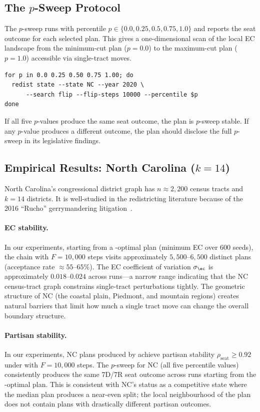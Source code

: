 \subsection{The $p$-Sweep Protocol}

The $p$-sweep runs \flip{} with percentile $p \in \{0.0, 0.25, 0.5, 0.75, 1.0\}$
and reports the seat outcome for each selected plan.
This gives a one-dimensional scan of the local EC landscape from the
minimum-cut plan ($p = 0.0$) to the maximum-cut plan ($p = 1.0$) accessible
via single-tract moves.

\begin{verbatim}
for p in 0.0 0.25 0.50 0.75 1.00; do
  redist state --state NC --year 2020 \
      --search flip --flip-steps 10000 --percentile $p
done
\end{verbatim}

If all five $p$-values produce the same seat outcome, the plan is
$p$-sweep stable.
If any $p$-value produces a different outcome, the plan should disclose the
full $p$-sweep in its legislative findings.

\subsection{Empirical Results: North Carolina ($k = 14$)}

North Carolina's congressional district graph has $n \approx 2{,}200$ census
tracts and $k = 14$ districts.
It is well-studied in the redistricting literature because of the 2016
``Rucho'' gerrymandering litigation~\citep{rucho2019}.

\paragraph{EC stability.}
In our experiments, starting from a \cs{}-optimal plan (minimum EC over
600 seeds), the \flip{} chain with $F = 10{,}000$ steps visits approximately
$5{,}500$--$6{,}500$ distinct plans (acceptance rate $\approx 55$--$65\%$).
The EC coefficient of variation $\sigma_{\ec}$ is approximately $0.018$--$0.024$
across runs---a narrow range indicating that the NC census-tract graph
constrains single-tract perturbations tightly.
The geometric structure of NC (the coastal plain, Piedmont, and mountain
regions) creates natural barriers that limit how much a single tract move
can change the overall boundary structure.

\paragraph{Partisan stability.}
In our experiments, NC plans produced by \cs{} achieve partisan stability
$\rho_{\mathrm{seat}} \geq 0.92$ under \flip{} with $F = 10{,}000$ steps.
The $p$-sweep for NC (all five percentile values) consistently produces the
same 7D/7R seat outcome across runs starting from the \cs{}-optimal plan.
This is consistent with NC's status as a competitive state where the median
plan produces a near-even split; the local neighbourhood of the \cs{} plan
does not contain plans with drastically different partisan outcomes.

